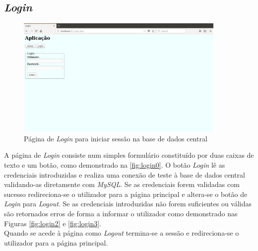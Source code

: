 \documentclass[11pt,twoside,a4paper]{report}
\begin{document}
\subsection{\textit{Login}}
\begin{figure}[H]
	\begin{center}
		\includegraphics[width=0.9\textwidth]{login01} %
		\caption{Página de \textit{Login} para iniciar sessão na base de dados central}
		\label{fig:login0}
	\end{center}
\end{figure}
A página de \textit{Login} consiste num simples formulário constituído por duas caixas de texto e um botão, como demonstrado na \autoref*{fig:login0}. O botão \textit{Login} lê as credenciais introduzidas e realiza uma conexão de teste à base de dados central validando-as diretamente com \textit{MySQL}. Se as credenciais forem validadas com sucesso redireciona-se o utilizador para a página principal e altera-se o botão de \textit{Login} para \textit{Logout}. Se as credenciais introduzidas não forem suficientes ou válidas são retornados erros de forma a informar o utilizador como demonstrado nas Figuras \ref{fig:login2} e \ref{fig:login3}.\\
Quando se acede à página como \textit{Logout} termina-se a sessão e redireciona-se o utilizador para a página principal.
\end{document}
